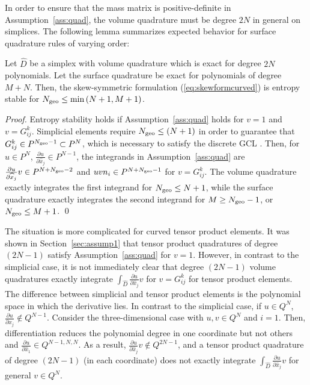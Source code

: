 \documentclass{svjour3}                     %
\renewcommand{\hat}{\widehat}
\newcommand{\pd}[2]{\frac{\partial#1}{\partial#2}}
\newcommand{\LRp}[1]{\left( #1 \right)}
\begin{document}
In order to ensure that the mass matrix is positive-definite in Assumption~\ref{ass:quad}, the volume quadrature must be degree $2N$ in general on simplices.  The following lemma summarizes expected behavior for surface quadrature rules of varying order:
\begin{lemma}
Let $\hat{D}$ be a simplex with volume quadrature which is exact for degree $2N$ polynomials.  Let the surface quadrature be exact for polynomials of degree $M+N$.  Then, the skew-symmetric formulation (\ref{eq:skewformcurved}) is entropy stable for $N_{\rm geo} \leq \min\LRp{N+1,M+1}$.
\label{lemma:curvsimp}
\end{lemma}
\begin{proof}
Entropy stability holds if Assumption~\ref{ass:quad} holds for $v = 1$ and $v = G^k_{ij}$.  
Simplicial elements require $N_{\rm geo}\leq (N+1)$ in order to guarantee that $G^k_{ij}\in P^{N_{\rm geo}-1} \subset P^{N}$, which is necessary to satisfy the discrete GCL \cite{chan2018discretely}.  Then, for $u \in P^N$, $\pd{u}{\hat{x}_j}\in P^{N-1}$, the integrands in Assumption~\ref{ass:quad} are $\pd{u}{\hat{x}_j} v \in P^{N+N_{\rm geo}-2}$ and $uv n_i \in P^{N+N_{\rm geo}-1}$ for $v = G^k_{ij}$.  The volume quadrature exactly integrates the first integrand for $N_{\rm geo} \leq N+1$, while the surface quadrature exactly integrates the second integrand for $M \geq N_{\rm geo}-1$, or $N_{\rm geo} \leq M+1$.
\qed\end{proof}

The situation is more complicated for curved tensor product elements.  It was shown in Section~\ref{sec:assump1} that tensor product quadratures of degree $(2N-1)$ satisfy Assumption~\ref{ass:quad} for $v = 1$.  However, in contrast to the simplicial case, it is not immediately clear that degree $(2N-1)$ volume quadratures exactly integrate $\int_{\hat{D}} \pd{u}{\hat{x}_j}v$ for $v = G^k_{ij}$ for tensor product elements.  The difference between simplicial and tensor product elements is the polynomial space in which the derivative lies.  In contrast to the simplicial case, if $u \in Q^N$, $\pd{u}{\hat{x}_j} \not\in Q^{N-1}$.  Consider the three-dimensional case with $u, v \in Q^N$ and $i = 1$.  Then, differentiation reduces the polynomial degree in one coordinate but not others and $\pd{u}{\hat{x}_1} \in Q^{N-1,N,N}$.  As a result, $\pd{u}{\hat{x}_j}v \not\in Q^{2N-1}$, and a tensor product quadrature of degree $(2N-1)$ (in each coordinate) does not exactly integrate $\int_{\hat{D}} \pd{u}{\hat{x}_j}v$ for general $v\in Q^N$.  
\end{document}
